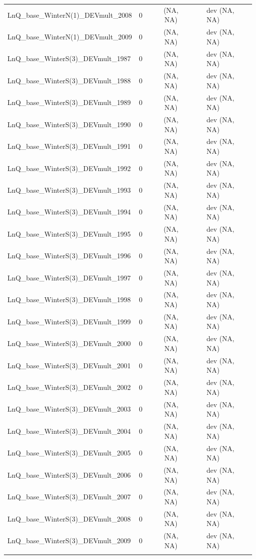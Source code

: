 \documentclass[12pt,]{article}
\begin{document}
\begin{landscape}
\begin{longtable}{lrcccll}
  LnQ\_base\_WinterN(1)\_DEVmult\_2008 & 0 &  & (NA, NA) &  &  & dev (NA, NA) \\ 
  LnQ\_base\_WinterN(1)\_DEVmult\_2009 & 0 &  & (NA, NA) &  &  & dev (NA, NA) \\ 
  LnQ\_base\_WinterS(3)\_DEVmult\_1987 & 0 &  & (NA, NA) &  &  & dev (NA, NA) \\ 
  LnQ\_base\_WinterS(3)\_DEVmult\_1988 & 0 &  & (NA, NA) &  &  & dev (NA, NA) \\ 
  LnQ\_base\_WinterS(3)\_DEVmult\_1989 & 0 &  & (NA, NA) &  &  & dev (NA, NA) \\ 
  LnQ\_base\_WinterS(3)\_DEVmult\_1990 & 0 &  & (NA, NA) &  &  & dev (NA, NA) \\ 
  LnQ\_base\_WinterS(3)\_DEVmult\_1991 & 0 &  & (NA, NA) &  &  & dev (NA, NA) \\ 
  LnQ\_base\_WinterS(3)\_DEVmult\_1992 & 0 &  & (NA, NA) &  &  & dev (NA, NA) \\ 
  LnQ\_base\_WinterS(3)\_DEVmult\_1993 & 0 &  & (NA, NA) &  &  & dev (NA, NA) \\ 
  LnQ\_base\_WinterS(3)\_DEVmult\_1994 & 0 &  & (NA, NA) &  &  & dev (NA, NA) \\ 
  LnQ\_base\_WinterS(3)\_DEVmult\_1995 & 0 &  & (NA, NA) &  &  & dev (NA, NA) \\ 
  LnQ\_base\_WinterS(3)\_DEVmult\_1996 & 0 &  & (NA, NA) &  &  & dev (NA, NA) \\ 
  LnQ\_base\_WinterS(3)\_DEVmult\_1997 & 0 &  & (NA, NA) &  &  & dev (NA, NA) \\ 
  LnQ\_base\_WinterS(3)\_DEVmult\_1998 & 0 &  & (NA, NA) &  &  & dev (NA, NA) \\ 
  LnQ\_base\_WinterS(3)\_DEVmult\_1999 & 0 &  & (NA, NA) &  &  & dev (NA, NA) \\ 
  LnQ\_base\_WinterS(3)\_DEVmult\_2000 & 0 &  & (NA, NA) &  &  & dev (NA, NA) \\ 
  LnQ\_base\_WinterS(3)\_DEVmult\_2001 & 0 &  & (NA, NA) &  &  & dev (NA, NA) \\ 
  LnQ\_base\_WinterS(3)\_DEVmult\_2002 & 0 &  & (NA, NA) &  &  & dev (NA, NA) \\ 
  LnQ\_base\_WinterS(3)\_DEVmult\_2003 & 0 &  & (NA, NA) &  &  & dev (NA, NA) \\ 
  LnQ\_base\_WinterS(3)\_DEVmult\_2004 & 0 &  & (NA, NA) &  &  & dev (NA, NA) \\ 
  LnQ\_base\_WinterS(3)\_DEVmult\_2005 & 0 &  & (NA, NA) &  &  & dev (NA, NA) \\ 
  LnQ\_base\_WinterS(3)\_DEVmult\_2006 & 0 &  & (NA, NA) &  &  & dev (NA, NA) \\ 
  LnQ\_base\_WinterS(3)\_DEVmult\_2007 & 0 &  & (NA, NA) &  &  & dev (NA, NA) \\ 
  LnQ\_base\_WinterS(3)\_DEVmult\_2008 & 0 &  & (NA, NA) &  &  & dev (NA, NA) \\ 
  LnQ\_base\_WinterS(3)\_DEVmult\_2009 & 0 &  & (NA, NA) &  &  & dev (NA, NA) \\ 
   \hline
\hline
\label{tab:model_params}
\end{longtable}
\endgroup
\end{landscape}
\end{document}
